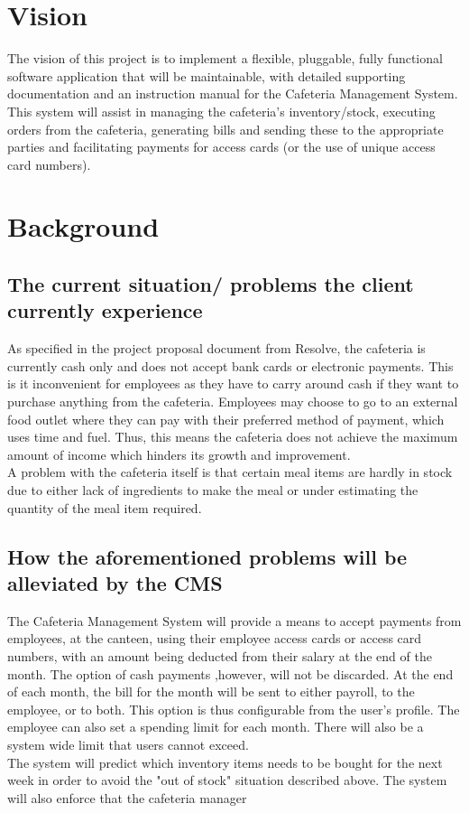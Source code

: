 \documentclass[a4paper,12pt]{report}
\begin{document}
\section{Vision}
The vision of this project is to implement a flexible, pluggable, fully functional software application that will be maintainable, with detailed supporting documentation and an instruction manual for the Cafeteria Management System. This system will assist in managing the cafeteria's inventory/stock, executing orders from the cafeteria, generating bills and sending these to the appropriate parties and facilitating payments for access cards (or the use of unique access card numbers). 

\section{Background}
\subsection{The current situation/ problems the client currently experience}
As specified in the project proposal document from Resolve, the cafeteria is currently cash only and does not accept bank cards or electronic payments. This is it inconvenient for employees as they have to carry around cash if they want to purchase anything from the cafeteria. Employees may choose to go to an external food outlet where they can pay with their preferred method of payment, which uses time and fuel. Thus, this means the cafeteria does not achieve the maximum amount of income which hinders its growth and improvement.\\ A problem with the cafeteria itself is that certain meal items are hardly in stock due to either lack of ingredients to make the meal or under estimating the quantity of the meal item required.

\subsection{How the aforementioned problems will be alleviated by the CMS}
The Cafeteria Management System will provide a means to accept payments from employees, at the canteen, using their employee access cards or access card numbers, with an amount being deducted from their salary at the end of the month.  The option of cash payments ,however, will not be discarded. At the end of each month, the bill for the month will be sent to either payroll, to the employee, or to both. This option is thus configurable from the user's profile. The employee can also set a spending limit for each month. There will also be a system wide limit that users cannot exceed.
\\
The system will predict which inventory items needs to be bought for the next week in order to avoid the "out of stock" situation described above. The system will also enforce that the cafeteria manager 
\\
\end{document}
